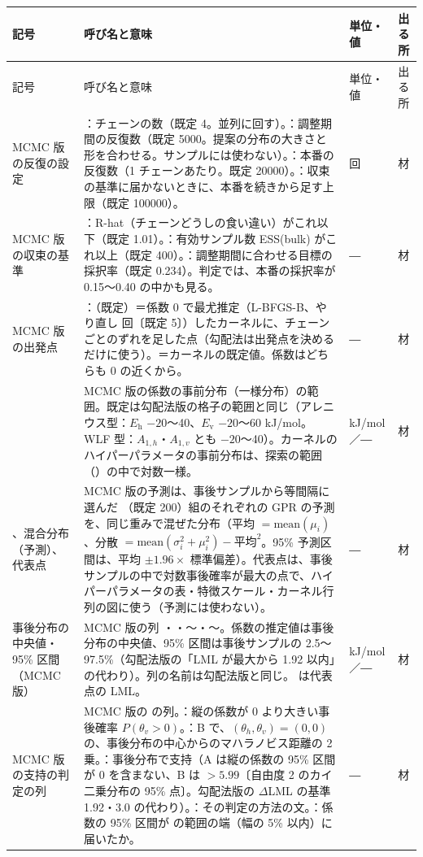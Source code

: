 \documentclass[paper=a4paper,fontsize=10.5pt,line_length=44zw,number_of_lines=38]{jlreq}
\makeatletter
\newcommand{\file}[1]{\texttt{\detokenize{#1}}}
\newcommand{\Eh}{E_{\mathrm{h}}}
\newcommand{\Ev}{E_{\mathrm{v}}}
\newenvironment{symtab}{%
  \begin{longtable}{@{}>{\raggedright\arraybackslash}p{6.5\zw}>{\raggedright\arraybackslash}p{22\zw}>{\raggedright\arraybackslash}p{6\zw}>{\raggedright\arraybackslash}p{4.5\zw}@{}}
  \toprule 記号 & 呼び名と意味 & 単位・値 & 出る所 \\ \midrule \endfirsthead
  \toprule 記号 & 呼び名と意味 & 単位・値 & 出る所 \\ \midrule \endhead
  \bottomrule \endlastfoot}{\end{longtable}}
\makeatother
\begin{document}
\begin{symtab}
MCMC 版の反復の設定 & \file{MCMC_CHAINS}：チェーンの数（既定 4。並列に回す）。\file{MCMC_WARM}：調整期間の反復数（既定 5000。提案の分布の大きさと形を合わせる。サンプルには使わない）。\file{MCMC_SAMPLES}：本番の反復数（1 チェーンあたり。既定 20000）。\file{MCMC_MAX_SAMPLES}：収束の基準に届かないときに、本番を続きから足す上限（既定 100000）。 & 回 & 材 \\
MCMC 版の収束の基準 & \file{MCMC_RHAT}：R-hat（チェーンどうしの食い違い）がこれ以下（既定 1.01）。\file{MCMC_ESS}：有効サンプル数 ESS(bulk) がこれ以上（既定 400）。\file{MCMC_TARGET_ACC}：調整期間に合わせる目標の採択率（既定 0.234）。判定では、本番の採択率が 0.15〜0.40 の中かも見る。 & ― & 材 \\
MCMC 版の出発点 & \file{MCMC_INIT}：\file{"mle"}（既定）＝係数 0 で最尤推定（L-BFGS-B、やり直し \file{MCMC_INIT_RESTARTS} 回〔既定 5〕）したカーネルに、チェーンごとのずれを足した点（勾配法は出発点を決めるだけに使う）。\file{"default"}＝カーネルの既定値。係数はどちらも 0 の近くから。 & ― & 材 \\
\file{SHIFT_PRIOR} & MCMC 版の係数の事前分布（一様分布）の範囲。既定は勾配法版の格子の範囲と同じ（アレニウス型：$\Eh$ $-20$〜40、$\Ev$ $-20$〜60 kJ/mol。WLF 型：$A_{1,h}$・$A_{1,v}$ とも $-20$〜40）。カーネルのハイパーパラメータの事前分布は、探索の範囲（\file{kernel.bounds}）の中で対数一様。 & kJ/mol／― & 材 \\
\file{N_PRED_DRAWS}、混合分布（予測）、代表点 & MCMC 版の予測は、事後サンプルから等間隔に選んだ \file{N_PRED_DRAWS}（既定 200）組のそれぞれの GPR の予測を、同じ重みで混ぜた分布（平均 $=\mathrm{mean}(\mu_i)$、分散 $=\mathrm{mean}(\sigma_i^2+\mu_i^2)-\text{平均}^2$。95\% 予測区間は、平均 $\pm1.96\times$ 標準偏差）。代表点は、事後サンプルの中で対数事後確率が最大の点で、ハイパーパラメータの表・特徴スケール・カーネル行列の図に使う（予測には使わない）。 & ― & 材 \\
事後分布の中央値・95\% 区間（MCMC 版） & MCMC 版の列 \file{th_best}・\file{tv_best}・\file{th_lo}〜\file{tv_hi}・\file{diff_best}〜\file{diff_hi}。係数の推定値は事後分布の中央値、95\% 区間は事後サンプルの 2.5〜97.5\%（勾配法版の「LML が最大から 1.92 以内」の代わり）。列の名前は勾配法版と同じ。\file{LML_best} は代表点の LML。 & kJ/mol／― & 材 \\
MCMC 版の支持の判定の列 & MCMC 版の \file{シフトファクターの推定.csv} の列。\file{P_tv_pos}：縦の係数が 0 より大きい事後確率 $P(\theta_v>0)$。\file{d2_zero}：B で、$(\theta_h,\theta_v)=(0,0)$ の、事後分布の中心からのマハラノビス距離の 2 乗。\file{supported}：事後分布で支持（A は縦の係数の 95\% 区間が 0 を含まない、B は \file{d2_zero} $>5.99$〔自由度 2 のカイ二乗分布の 95\% 点〕。勾配法版の $\Delta$LML の基準 1.92・3.0 の代わり）。\file{support_rule}：その判定の方法の文。\file{theta_at_edge}：係数の 95\% 区間が \file{SHIFT_PRIOR} の範囲の端（幅の 5\% 以内）に届いたか。 & ― & 材 \\

\end{symtab}
\end{document}
